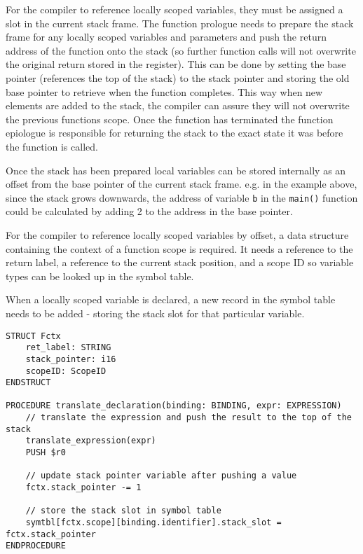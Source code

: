 For the compiler to reference locally scoped variables, they must be assigned a slot in the current stack frame. The function prologue needs to prepare the stack frame for any locally scoped variables and parameters and push the return address of the function onto the stack (so further function calls will not overwrite the original return stored in the register). This can be done by setting the base pointer (references the top of the stack) to the stack pointer and storing the old base pointer to retrieve when the function completes. This way when new elements are added to the stack, the compiler can assure they will not overwrite the previous functions scope. Once the function has terminated the function epiologue is responsible for returning the stack to the exact state it was before the function is called.

\begin{center}
\end{center}

Once the stack has been prepared local variables can be stored internally as an offset from the base pointer of the current stack frame. e.g. in the example above, since the stack grows downwards, the address of variable \texttt{b} in the \texttt{main()} function could be calculated by adding 2 to the address in the base pointer.

For the compiler to reference locally scoped variables by offset, a data structure containing the context of a function scope is required. It needs a reference to the return label, a reference to the current stack position, and a scope ID so variable types can be looked up in the symbol table.

When a locally scoped variable is declared, a new record in the symbol table needs to be added - storing the stack slot for that particular variable. 

\begin{lstlisting}
STRUCT Fctx
    ret_label: STRING 
    stack_pointer: i16 
    scopeID: ScopeID
ENDSTRUCT

PROCEDURE translate_declaration(binding: BINDING, expr: EXPRESSION) 
    // translate the expression and push the result to the top of the stack
    translate_expression(expr)
    PUSH $r0

    // update stack pointer variable after pushing a value 
    fctx.stack_pointer -= 1 

    // store the stack slot in symbol table
    symtbl[fctx.scope][binding.identifier].stack_slot = fctx.stack_pointer
ENDPROCEDURE
\end{lstlisting}


